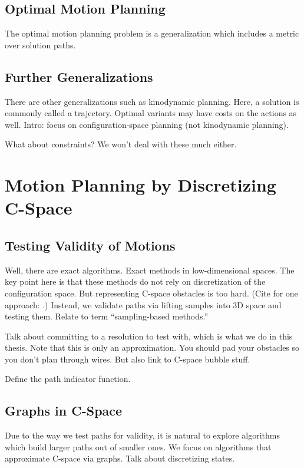 \subsection{Optimal Motion Planning}

The optimal motion planning problem is a generalization which
includes a metric over solution paths.

\subsection{Further Generalizations}

There are other generalizations such as kinodynamic planning.
Here, a solution is commonly called a trajectory.
Optimal variants may have costs on the actions as well.
Intro: focus on configuration-space planning (not kinodynamic planning).

What about constraints? We won't deal with these much either.

\section{Motion Planning by Discretizing C-Space}

\subsection{Testing Validity of Motions}

Well, there are exact algorithms.
Exact methods in low-dimensional spaces.
The key point here is that these methods do not rely on discretization
of the configuration space.
But representing C-space obstacles is too hard.
(Cite for one approach: \citep{lozanoperez1983cspace}.)
Instead, we validate paths via lifting samples
into 3D space and testing them.
Relate to term ``sampling-based methods.''

Talk about committing to a resolution to test with,
which is what we do in this thesis.
Note that this is only an approximation.
You should pad your obstacles so you don't plan through wires.
But also link to C-space bubble stuff.

Define the path indicator function.

\subsection{Graphs in C-Space}

Due to the way we test paths for validity,
it is natural to explore algorithms which build larger paths
out of smaller ones.
We focus on algorithms that approximate C-space via graphs.
Talk about discretizing states.

